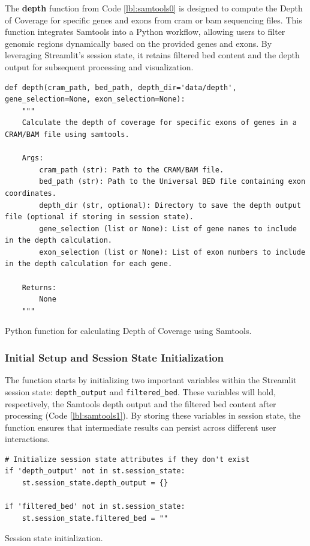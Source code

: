 The \textbf{depth} function from Code \ref{lbl:samtools0} is designed to compute the Depth of Coverage for specific genes and exons from \ac{cram} or \ac{bam} sequencing files. This function integrates Samtools into a Python workflow, allowing users to filter genomic regions dynamically based on the provided genes and exons. By leveraging Streamlit's session state, it retains filtered \ac{bed} content and the depth output for subsequent processing and visualization.

\begin{longlisting}
    \begin{verbatim}
def depth(cram_path, bed_path, depth_dir='data/depth', gene_selection=None, exon_selection=None):
    """
    Calculate the depth of coverage for specific exons of genes in a CRAM/BAM file using samtools.

    Args:
        cram_path (str): Path to the CRAM/BAM file.
        bed_path (str): Path to the Universal BED file containing exon coordinates.
        depth_dir (str, optional): Directory to save the depth output file (optional if storing in session state).
        gene_selection (list or None): List of gene names to include in the depth calculation.
        exon_selection (list or None): List of exon numbers to include in the depth calculation for each gene.

    Returns:
        None
    """
    \end{verbatim}
    \caption{Python function for calculating Depth of Coverage using Samtools.}
    \label{lbl:samtools0}
    \end{longlisting}

\subsubsection{\textbf{Initial Setup and Session State Initialization}}

The function starts by initializing two important variables within the Streamlit session state: \texttt{depth\_output} and \texttt{filtered\_bed}. These variables will hold, respectively, the Samtools depth output and the filtered \ac{bed} content after processing (Code \ref{lbl:samtools1}). By storing these variables in session state, the function ensures that intermediate results can persist across different user interactions.

\begin{longlisting}
\begin{verbatim}
# Initialize session state attributes if they don't exist
if 'depth_output' not in st.session_state:
    st.session_state.depth_output = {}
    
if 'filtered_bed' not in st.session_state:
    st.session_state.filtered_bed = ""
\end{verbatim}
\caption{Session state initialization.}
\label{lbl:samtools1}
\end{longlisting}

